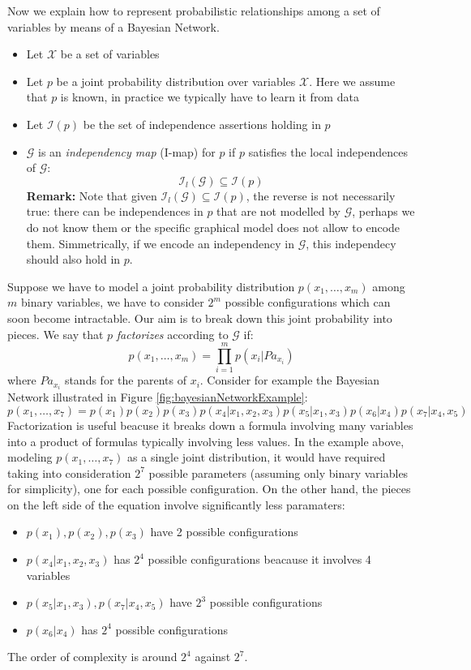 Now we explain how to represent probabilistic relationships among a set of variables by means of a Bayesian Network.
\begin{itemize}
    \item Let $\mathcal{X}$ be a set of variables
    \item Let $p$ be a joint probability distribution over variables $\mathcal{X}$. Here we assume that $p$ is known, in practice we typically have to learn it from data
    \item Let $\mathcal{I}(p)$ be the set of independence assertions holding in $p$
    \item $\mathcal{G}$ is an \textit{independency map} (I-map) for $p$ if $p$ satisfies the local independences of $\mathcal{G}$:
    $$\mathcal{I}_l(\mathcal{G}) \subseteq \mathcal{I}(p)$$
    \textbf{Remark:} Note that given $\mathcal{I}_l(\mathcal{G}) \subseteq \mathcal{I}(p)$, the reverse is not necessarily true: there can be independences in $p$ that are not modelled by $\mathcal{G}$, perhaps we do not know them or the specific graphical model does not allow to encode them. Simmetrically, if we encode an independency in $\mathcal{G}$, this independecy should also hold in $p$.
\end{itemize}
Suppose we have to model a joint probability distribution $p(x_1, \hdots, x_m)$ among $m$ binary variables, we have to consider $2^m$ possible configurations which can soon become intractable. Our aim is to break down this joint probability into pieces. We say that $p$ \textit{factorizes} according to $\mathcal{G}$ if:
$$p(x_1, \hdots, x_m) = \prod_{i=1}^m p(x_i | \mathit{Pa}_{x_i})$$
where $\mathit{Pa}_{x_i}$ stands for the parents of $x_i$. Consider for example the Bayesian Network illustrated in Figure \ref{fig:bayesianNetworkExample}:
$$p(x_1, \hdots, x_7) = p(x_1)p(x_2)p(x_3)p(x_4|x_1,x_2,x_3)p(x_5|x_1,x_3)p(x_6|x_4)p(x_7|x_4,x_5)$$
Factorization is useful beacuse it breaks down a formula involving many variables into a product of formulas typically involving less values. In the example above, modeling $p(x_1,\hdots, x_7)$ as a single joint distribution, it would have required taking into consideration $2^7$ possible parameters (assuming only binary variables for simplicity), one for each possible configuration. On the other hand, the pieces on the left side of the equation involve significantly less paramaters:
\begin{itemize}
    \item $p(x_1),p(x_2),p(x_3)$ have 2 possible configurations
    \item $p(x_4|x_1,x_2,x_3)$ has $2^4$ possible configurations beacause it involves 4 variables
    \item $p(x_5|x_1,x_3), p(x_7|x_4,x_5)$ have $2^3$ possible configurations
    \item $p(x_6|x_4)$ has $2^4$ possible configurations
\end{itemize}
The order of complexity is around $2^4$ against $2^7$. \newline

